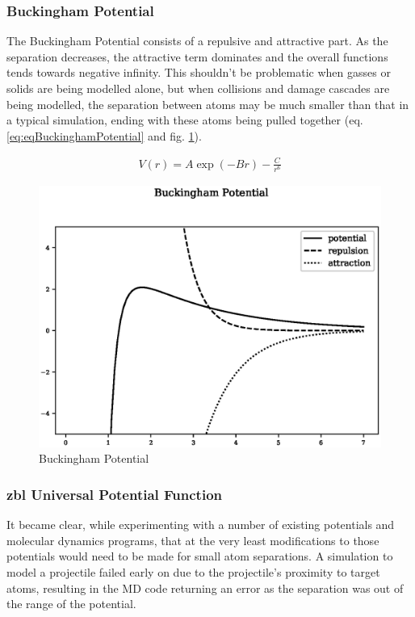 \FloatBarrier
\subsubsection{Buckingham Potential}
\label{section:Buckingham}

The Buckingham Potential consists of a repulsive and attractive part.  As the separation decreases, the attractive term dominates and the overall functions tends towards negative infinity.  This shouldn't be problematic when gasses or solids are being modelled alone, but when collisions and damage cascades are being modelled, the separation between atoms may be much smaller than that in a typical simulation, ending with these atoms being pulled together (eq. \ref{eq:eqBuckinghamPotential} and fig. \ref{fig:buckinghamplot}).

\begin{equation}
\begin{split}
V(r) = A \exp(-B  r) - \frac{C}{r^6}
\end{split}
\label{eq:eqBuckinghamPotential}
\end{equation}

\begin{figure}[!htbp]
  \begin{center}
    \includegraphics[width=.5\linewidth]{chapters/background_potential_fitting/plots/buckingham.eps}
    \caption{Buckingham Potential}
    \label{fig:buckinghamplot}
  \end{center}
\end{figure}





\FloatBarrier
\subsubsection{\acrlong{zbl} Universal Potential Function}
\label{section:ZBL}

It became clear, while experimenting with a number of existing potentials and molecular dynamics programs, that at the very least modifications to those potentials would need to be made for small atom separations.  A simulation to model a projectile failed early on due to the projectile's proximity to target atoms, resulting in the MD code returning an error as the separation was out of the range of the potential.

